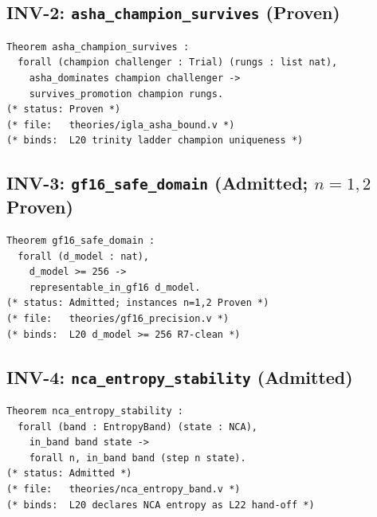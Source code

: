 
\subsection{INV-2: \texttt{asha\_champion\_survives} (Proven)}

\begin{verbatim}
Theorem asha_champion_survives :
  forall (champion challenger : Trial) (rungs : list nat),
    asha_dominates champion challenger ->
    survives_promotion champion rungs.
(* status: Proven *)
(* file:   theories/igla_asha_bound.v *)
(* binds:  L20 trinity ladder champion uniqueness *)
\end{verbatim}


\subsection{INV-3: \texttt{gf16\_safe\_domain} (Admitted; $n=1,2$ Proven)}

\begin{verbatim}
Theorem gf16_safe_domain :
  forall (d_model : nat),
    d_model >= 256 ->
    representable_in_gf16 d_model.
(* status: Admitted; instances n=1,2 Proven *)
(* file:   theories/gf16_precision.v *)
(* binds:  L20 d_model >= 256 R7-clean *)
\end{verbatim}


\subsection{INV-4: \texttt{nca\_entropy\_stability} (Admitted)}

\begin{verbatim}
Theorem nca_entropy_stability :
  forall (band : EntropyBand) (state : NCA),
    in_band band state ->
    forall n, in_band band (step n state).
(* status: Admitted *)
(* file:   theories/nca_entropy_band.v *)
(* binds:  L20 declares NCA entropy as L22 hand-off *)
\end{verbatim}

